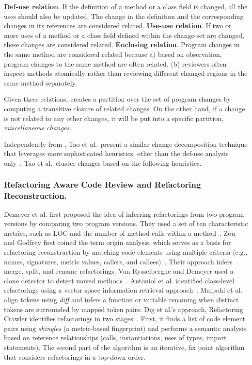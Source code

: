 \documentclass[runningheads,a4paper]{llncs}
\begin{document}
 {\bf Def-use relation}. If the definition of a method or a class field is changed, all the uses should also be updated. The change in the definition and the corresponding changes in its references are considered related.
 {\bf Use-use relation}. If two or more uses of a method or a class field defined within the change-set are changed, these changes are considered related. 
 {\bf Enclosing relation}. Program changes in the same method are considered related because a) based on observation, program changes to the same method are often related, (b) reviewers often inspect methods atomically rather than reviewing different changed regions in the same method separately.

Given these relations, {\clusterchanges} creates a partition over the set of program changes by computing a transitive closure of related changes. On the other hand, if a change is not related to any other changes, it will be put into a specific partition, {\em miscellaneous changes}.

Independently from {\clusterchanges}, Tao et al.~present a similar change decomposition technique that leverages more sophisticated heuristics, other than the def-use analysis only~\cite{tao2015partitioning}. Tao et al.~cluster changes based on the following heuristics.

\subsubsection{Refactoring Aware Code Review and Refactoring Reconstruction.}  
Demeyer {et al.} first proposed the idea of inferring refactorings from two program versions by comparing two program versions. They used a set of ten characteristic metrics, such as LOC and the number of method calls within a method~\cite{Demeyer2000}. Zou and Godfrey first coined the term origin analysis, which serves as a basis for refactoring reconstruction by matching code elements using multiple criteria (e.g., names, signatures, metric values, callers, and callees)~\cite{Zou2005}. Their approach infers merge, split, and rename refactorings. Van Rysselberghe and Demeyer used a clone detector to detect moved methods~\cite{Rysselberghe2003}.  Antoniol {et al.} identified class-level refactorings using a vector space information retrieval approach~\cite{Antoniol2004}. Malpohl {et al.} \cite{Malpohl2000} align tokens using {\it diff} and infers a function or variable renaming when distinct tokens are surrounded by mapped token pairs. Dig et al.'s approach, {Refactoring Crawler} identifies refactorings in two stages~\cite{Dig2006}. First, it finds a list of code element pairs using {\em shingles} (a metric-based fingerprint) and performs a semantic analysis based on reference relationships (calls, instantiations, uses of types, import statements). The second part of the algorithm is an iterative, fix point algorithm that considers refactorings in a top-down order. 
\end{document}
